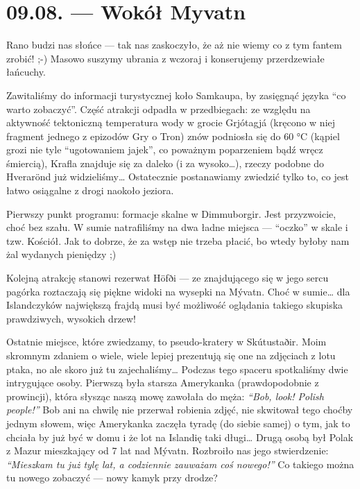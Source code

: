 \chapter*{09.08. --- Wokół Myvatn}

Rano budzi nas słońce --- tak nas zaskoczyło, że aż nie wiemy co z tym fantem zrobić! ;-) Masowo suszymy ubrania z wczoraj i konserujemy przerdzewiałe łańcuchy.

Zawitaliśmy do informacji turystycznej koło Samkaupa, by zasięgnąć języka “co warto zobaczyć”. Część atrakcji odpadła w przedbiegach: ze względu na aktywność tektoniczną temperatura wody w grocie Grjótagjá (kręcono w niej fragment jednego z epizodów Gry o Tron) znów podniosła się do 60 °C (kąpiel grozi nie tyle “ugotowaniem jajek”, co poważnym poparzeniem bądź wręcz śmiercią), Krafla znajduje się za daleko (i za wysoko…), rzeczy podobne do Hverarönd już widzieliśmy… Ostatecznie postanawiamy zwiedzić tylko to, co jest łatwo osiągalne z drogi naokoło jeziora.

Pierwszy punkt programu: formacje skalne w Dimmuborgir. Jest przyzwoicie, choć bez szału. W sumie natrafiliśmy na dwa ładne miejsca --- “oczko” w skale i tzw. Kościół. Jak to dobrze, że za wstęp nie trzeba płacić, bo wtedy byłoby nam żal wydanych pieniędzy ;)


Kolejną atrakcję stanowi rezerwat Höfði --- ze znajdującego się w jego sercu pagórka roztaczają się piękne widoki na wysepki na Mývatn. Choć w sumie… dla Islandczyków największą frajdą musi być możliwość oglądania takiego skupiska prawdziwych, wysokich drzew!

Ostatnie miejsce, które zwiedzamy, to pseudo-kratery w Skútustaðir. Moim skromnym zdaniem o wiele, wiele lepiej prezentują się one na zdjęciach z lotu ptaka, no ale skoro już tu zajechaliśmy… Podczas tego spaceru spotkaliśmy dwie intrygujące osoby. Pierwszą była starsza Amerykanka (prawdopodobnie z prowincji), która słysząc naszą mowę zawołała do męża: \emph{“Bob, look! Polish people!”} Bob ani na chwilę nie przerwał robienia zdjęć, nie skwitował tego choćby jednym słowem, więc Amerykanka zaczęła tyradę (do siebie samej) o tym, jak to chciała by już być w domu i że lot na Islandię taki długi… Drugą osobą był Polak z Mazur mieszkający od 7 lat nad Mývatn. Rozbroiło nas jego stwierdzenie: \emph{“Mieszkam tu już tylę lat, a codziennie zauważam coś nowego!”} Co takiego można tu nowego zobaczyć --- nowy kamyk przy drodze?

